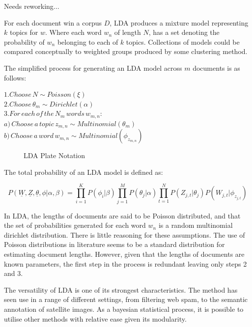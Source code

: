 \documentclass[10pt]{report}
\begin{document}
{\hspace*{40mm}Needs reworking...}

For each document win a corpus \(D\), LDA produces a mixture model representing  \(k\) topics for \(w\). Where each word \(w_n\) of length \(N\), has a set denoting the probability of \(w_n\) belonging to each of \(k\) topics. Collections of models could be compared conceptually to weighted groups produced by some clustering method.

\renewcommand{\baselinestretch}{1.5}\normalsize
The simplified process for generating an LDA model across \(m\) documents is as follows:

\renewcommand{\baselinestretch}{1.0}\normalsize
\(1. Choose\, N \sim Poisson(\xi)\)\\
\(2. Choose\, \theta_m \sim Dirichlet(\alpha)\)\\
\(3. For\, each\, of\, the\, N_m\, words\, w_{m,n}:\)\\
{\hspace*{15mm} \(a)\, Choose\, a\, topic\, z_{m,n} \sim Multinomial(\theta_m)  \)}\\
{\hspace*{15mm} \(b)\, Choose\, a\, word\, w_{m,n} \sim Multinomial(\phi_{z_{m,n}}) \)}\\

\begin{figure}[h]
  \caption{LDA Plate Notation\label{fig:lda_plate_notation}}
\end{figure}
\renewcommand{\baselinestretch}{2.0}\normalsize

\renewcommand{\baselinestretch}{1.0}\normalsize
The total probability of an LDA model is defined as:

\[
  P(\underline{W},\underline{Z},\underline{\theta},\phi|\alpha,\beta) = \prod^{K}_{i=1} P(\phi_i|\beta) \prod^{M}_{j=1} P(\theta_j|\alpha)\prod^{N}_{t=1} P(Z_{j,t} | \theta_j)P(W_{j,t} | \phi_{z_{j,t}})
\]

\renewcommand{\baselinestretch}{2.0}\normalsize
In LDA, the lengths of documents are said to be Poisson distributed, and that the set of probabilities  generated for each word \(w_n\) is a random multinomial dirichlet distribution. There is little reasoning for these assumptions. The use of Poisson distributions in literature seems to be a standard distribution for estimating document lengths. However, given that the lengths of documents are known parameters, the first step in the process is redundant leaving only steps 2 and 3.

The versatility of LDA is one of its strongest characteristics. The method has seen use in a range of different settings, from filtering web spam, to the semantic annotation of satellite images. As a bayesian statistical process, it is possible to utilise other methods with relative ease given its modularity.
\end{document}
